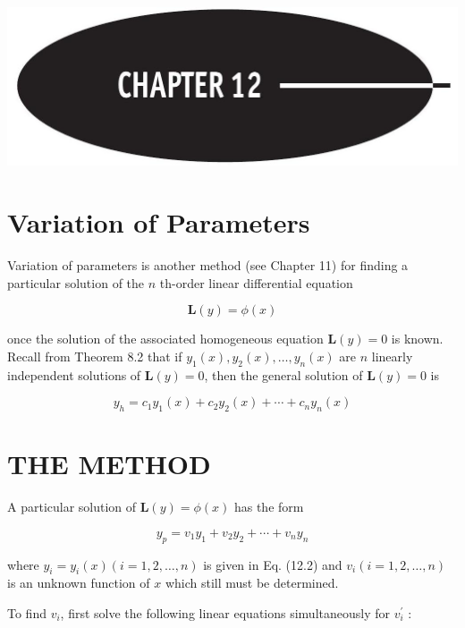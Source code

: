 \documentclass[10pt]{article}
\begin{document}
\begin{center}
\includegraphics[max width=\textwidth]{2024_04_03_5bb5b4275a64cb9887d1g-121}
\end{center}

\section*{Variation of Parameters}
Variation of parameters is another method (see Chapter 11) for finding a particular solution of the $n$ th-order linear differential equation


\begin{equation*}
\mathbf{L}(y)=\phi(x) \tag{12.1}
\end{equation*}


once the solution of the associated homogeneous equation $\mathbf{L}(y)=0$ is known. Recall from Theorem 8.2 that if $y_{1}(x), y_{2}(x), \ldots, y_{n}(x)$ are $n$ linearly independent solutions of $\mathbf{L}(y)=0$, then the general solution of $\mathbf{L}(y)=0$ is


\begin{equation*}
y_{h}=c_{1} y_{1}(x)+c_{2} y_{2}(x)+\cdots+c_{n} y_{n}(x) \tag{12.2}
\end{equation*}


\section*{THE METHOD}
A particular solution of $\mathbf{L}(y)=\phi(x)$ has the form


\begin{equation*}
y_{p}=v_{1} y_{1}+v_{2} y_{2}+\cdots+v_{n} y_{n} \tag{12.3}
\end{equation*}


where $y_{i}=y_{i}(x)(i=1,2, \ldots, n)$ is given in Eq. (12.2) and $v_{i}(i=1,2, \ldots, n)$ is an unknown function of $x$ which still must be determined.

To find $v_{i}$, first solve the following linear equations simultaneously for $v_{i}^{\prime}$ :
\end{document}
